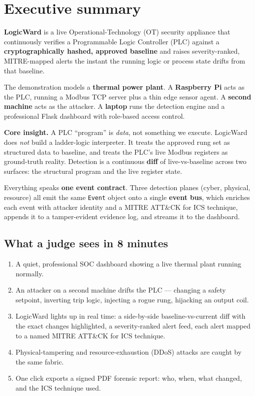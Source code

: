 \documentclass[11pt,a4paper]{article}
\newcommand{\code}[1]{\texttt{\small #1}}
\begin{document}
\tableofcontents
\newpage

\section{Executive summary}

\textbf{LogicWard} is a live Operational-Technology (OT) security appliance that continuously
verifies a Programmable Logic Controller (PLC) against a \textbf{cryptographically hashed,
approved baseline} and raises severity-ranked, MITRE-mapped alerts the instant the running logic
or process state drifts from that baseline.

The demonstration models a \textbf{thermal power plant}. A \textbf{Raspberry Pi} acts as the PLC,
running a Modbus TCP server plus a thin edge sensor agent. A \textbf{second machine} acts as the
attacker. A \textbf{laptop} runs the detection engine and a professional Flask dashboard with
role-based access control.

\begin{keybox}
\textbf{Core insight.} A PLC ``program'' is \emph{data}, not something we execute. LogicWard does
\emph{not} build a ladder-logic interpreter. It treats the approved rung set as structured data to
baseline, and treats the PLC's live Modbus registers as ground-truth reality. Detection is a
continuous \textbf{diff} of live-vs-baseline across two surfaces: the structural program and the
live register state.
\end{keybox}

Everything speaks \textbf{one event contract}. Three detection planes (cyber, physical, resource)
all emit the same \code{Event} object onto a single \textbf{event bus}, which enriches each event
with attacker identity and a MITRE ATT\&CK for ICS technique, appends it to a tamper-evident
evidence log, and streams it to the dashboard.

\subsection{What a judge sees in 8 minutes}
\begin{enumerate}[leftmargin=1.5em,itemsep=2pt]
  \item A quiet, professional SOC dashboard showing a live thermal plant running normally.
  \item An attacker on a second machine drifts the PLC --- changing a safety setpoint, inverting
        trip logic, injecting a rogue rung, hijacking an output coil.
  \item LogicWard lights up in real time: a side-by-side baseline-vs-current diff with the exact
        changes highlighted, a severity-ranked alert feed, each alert mapped to a named MITRE
        ATT\&CK for ICS technique.
  \item Physical-tampering and resource-exhaustion (DDoS) attacks are caught by the same fabric.
  \item One click exports a signed PDF forensic report: who, when, what changed, and the ICS
        technique used.
\end{enumerate}
\end{document}

